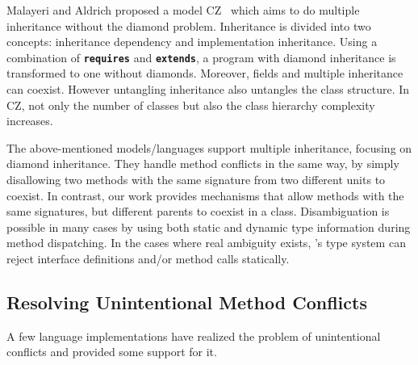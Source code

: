 \begin{comment}
There are also proposals for extending Java with traits. For example, 
FeatherTrait Java (FTJ) [14] extends FJ [13] with statically-typed traits, 
adding trait-based inheritance in Java. Except for few, mostly syntac- tic details, 
their work can be emulated with Java 8 interfaces. There are also extensions 
to the original trait model, with operations (e.g. renaming [18], which breaks 
structural sub- typing) that default methods and interfaces cannot model.
\end{comment}

Malayeri and Aldrich proposed a model CZ~\cite{malayeri2009cz} which
aims to do multiple inheritance without the diamond problem.
Inheritance is divided into two concepts: inheritance dependency and
implementation inheritance.  Using a combination of
\textbf{\texttt{requires}} and \textbf{\texttt{extends}}, a program
with diamond inheritance is transformed to one without
diamonds. Moreover, fields and multiple inheritance can coexist.
However untangling inheritance also untangles the class structure. In
CZ, not only the number of classes but also the class hierarchy
complexity increases.

The above-mentioned models/languages support multiple inheritance, 
focusing on diamond inheritance.
They handle method conflicts in the same way, by simply disallowing
two methods with the same signature from two different units to
coexist. In contrast, our work provides mechanisms that allow 
methods with the same signatures, but different parents to coexist 
in a class. Disambiguation is possible in many cases by using both 
static and dynamic type information during method dispatching.
In the cases where real ambiguity exists, \MIM{}'s type system can
reject interface definitions and/or method calls statically.

\subsection{Resolving Unintentional Method Conflicts}\label{subsec:middleman}
A few language implementations have realized the problem of
unintentional conflicts and provided some support for it.

